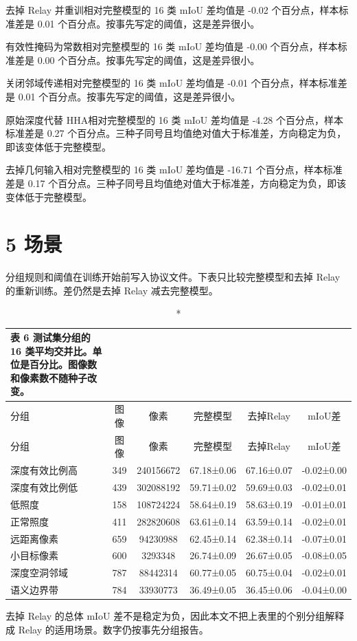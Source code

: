 \documentclass[11pt]{article}
\begin{document}
去掉 Relay 并重训相对完整模型的 16 类 mIoU 差均值是 -0.02 个百分点，样本标准差是 0.01 个百分点。按事先写定的阈值，这是差异很小。

有效性掩码为常数相对完整模型的 16 类 mIoU 差均值是 -0.00 个百分点，样本标准差是 0.00 个百分点。按事先写定的阈值，这是差异很小。

关闭邻域传递相对完整模型的 16 类 mIoU 差均值是 -0.01 个百分点，样本标准差是 0.01 个百分点。按事先写定的阈值，这是差异很小。

原始深度代替 HHA相对完整模型的 16 类 mIoU 差均值是 -4.28 个百分点，样本标准差是 0.27 个百分点。三种子同号且均值绝对值大于标准差，方向稳定为负，即该变体低于完整模型。

去掉几何输入相对完整模型的 16 类 mIoU 差均值是 -16.71 个百分点，样本标准差是 0.17 个百分点。三种子同号且均值绝对值大于标准差，方向稳定为负，即该变体低于完整模型。

\section*{5  场景}
分组规则和阈值在训练开始前写入协议文件。下表只比较完整模型和去掉 Relay 的重新训练。差仍然是去掉 Relay 减去完整模型。

{\footnotesize\setlength{\tabcolsep}{3pt}
\begin{longtable}{lccccc}
\caption*{表 6  测试集分组的 16 类平均交并比。单位是百分比。图像数和像素数不随种子改变。}\\
\toprule
分组 & 图像 & 像素 & 完整模型 & 去掉Relay & mIoU差\\
\midrule
\endfirsthead
\toprule
分组 & 图像 & 像素 & 完整模型 & 去掉Relay & mIoU差\\
\midrule
\endhead
深度有效比例高 & 349 & 240156672 & 67.18±0.06 & 67.16±0.07 & -0.02±0.00\\
深度有效比例低 & 439 & 302088192 & 59.71±0.02 & 59.69±0.03 & -0.02±0.01\\
低照度 & 158 & 108724224 & 58.64±0.19 & 58.63±0.19 & -0.01±0.01\\
正常照度 & 411 & 282820608 & 63.61±0.14 & 63.59±0.14 & -0.02±0.01\\
远距离像素 & 659 & 94230988 & 62.45±0.14 & 62.38±0.14 & -0.07±0.01\\
小目标像素 & 600 & 3293348 & 26.74±0.09 & 26.67±0.05 & -0.08±0.05\\
深度空洞邻域 & 787 & 88442314 & 60.77±0.05 & 60.75±0.04 & -0.02±0.01\\
语义边界带 & 784 & 33930773 & 36.49±0.05 & 36.45±0.06 & -0.04±0.00\\
\bottomrule
\end{longtable}}
去掉 Relay 的总体 mIoU 差不是稳定为负，因此本文不把上表里的个别分组解释成 Relay 的适用场景。数字仍按事先分组报告。
\end{document}
